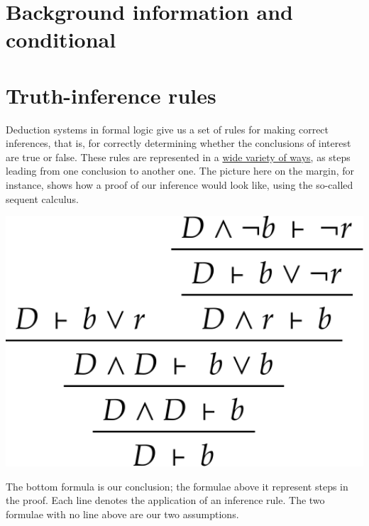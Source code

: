 \documentclass[
  a4paper,
  DIV=11,
  numbers=noendperiod,
  oneside]{scrreprt}
\begin{document}
\hypertarget{background-information-and-conditional}{%
\section{Background information and
conditional}\label{background-information-and-conditional}}

\hfill\break

\hypertarget{truth-inference-rules}{%
\section{Truth-inference rules}\label{truth-inference-rules}}

Deduction systems in formal logic give us a set of rules for making
correct inferences, that is, for correctly determining whether the
conclusions of interest are true or false. These rules are represented
in a
\href{https://plato.stanford.edu/archives/spr2023/entries/natural-deduction}{wide
variety of ways}, as steps leading from one conclusion to another one.
The picture here on the margin, for instance, shows how a proof of our
inference would look like, using the so-called sequent calculus.

\begin{marginfigure}

{\centering \includegraphics[width=1\textwidth,height=\textheight]{umbrella_inference_sequent.png}

}

\caption{The bottom formula is our conclusion; the formulae above it
represent steps in the proof. Each line denotes the application of an
inference rule. The two formulae with no line above are our two
assumptions.}

\end{marginfigure}
\end{document}
